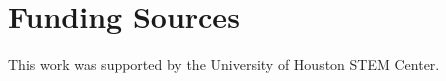 \section{Funding Sources}
\label{funding}
This work was supported by the University of Houston STEM Center.
%
%
%
%
